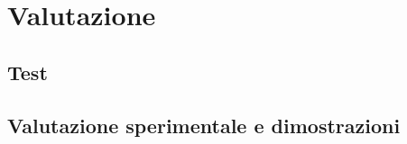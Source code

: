 \section{Valutazione}\label{valutazione}

\subsection{Test}\label{test}

\subsection{Valutazione sperimentale e
dimostrazioni}\label{valutazione-sperimentale-e-dimostrazioni}
